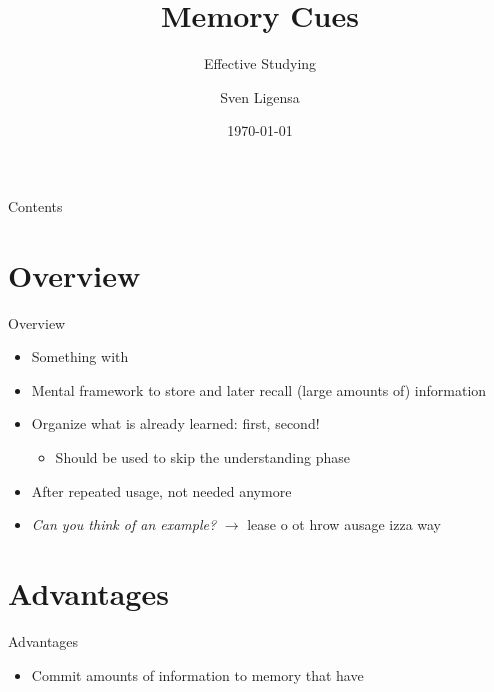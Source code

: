 \documentclass{ercisbeamer}
\title{Memory Cues}
\subtitle{Effective Studying}
\author{Sven Ligensa}
\institute{European Research Center for Information Systems (ERCIS)}
\date{\today}
\begin{document}
\begin{frame}
    \begin{tbox}
        \titlepage
    \end{tbox}
\end{frame}
\setbgimage{}

\begin{frame}{Contents}
    \tableofcontents
\end{frame}

\section{Overview}
\begin{frame}{Overview}
    \begin{tbox}
        \begin{itemize}
            \item Something with 
            \item Mental framework to store and later recall (large amounts of) information
            \item Organize what is already learned:  first,  second!
            \begin{itemize}
                \item Should  be used to skip the understanding phase
            \end{itemize} 
            \item After repeated usage, not needed anymore
            \item \emph{Can you think of an example?} \pause
            $\rightarrow$ lease o ot hrow ausage izza way 
        \end{itemize}
    \end{tbox}
\end{frame}
\setbgimage{}

\section{Advantages}
\begin{frame}{Advantages}
    \begin{itemize}
        \item Commit  amounts of information to memory that have 
    \end{itemize}
\end{frame}
\end{document}

